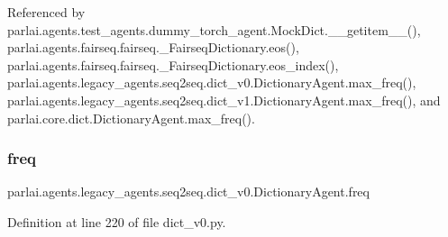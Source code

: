 Referenced by parlai.\+agents.\+test\+\_\+agents.\+dummy\+\_\+torch\+\_\+agent.\+Mock\+Dict.\+\_\+\+\_\+getitem\+\_\+\+\_\+(), parlai.\+agents.\+fairseq.\+fairseq.\+\_\+\+Fairseq\+Dictionary.\+eos(), parlai.\+agents.\+fairseq.\+fairseq.\+\_\+\+Fairseq\+Dictionary.\+eos\+\_\+index(), parlai.\+agents.\+legacy\+\_\+agents.\+seq2seq.\+dict\+\_\+v0.\+Dictionary\+Agent.\+max\+\_\+freq(), parlai.\+agents.\+legacy\+\_\+agents.\+seq2seq.\+dict\+\_\+v1.\+Dictionary\+Agent.\+max\+\_\+freq(), and parlai.\+core.\+dict.\+Dictionary\+Agent.\+max\+\_\+freq().

\mbox{\label{classparlai_1_1agents_1_1legacy__agents_1_1seq2seq_1_1dict__v0_1_1DictionaryAgent_a72c5f2c2c0348076bcc48dc1c5b2e36c}} 
\subsubsection{\texorpdfstring{freq}{freq}}
{\footnotesize\ttfamily parlai.\+agents.\+legacy\+\_\+agents.\+seq2seq.\+dict\+\_\+v0.\+Dictionary\+Agent.\+freq}



Definition at line 220 of file dict\+\_\+v0.\+py.




